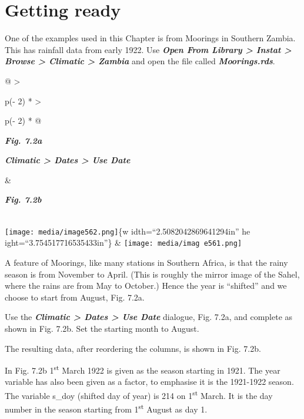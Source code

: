 \documentclass[
  letterpaper,
  DIV=11,
  numbers=noendperiod]{scrreprt}
\begin{document}
\section{Getting ready}\label{getting-ready}

One of the examples used in this Chapter is from Moorings in Southern
Zambia. This has rainfall data from early 1922. Use \textbf{\emph{Open
From Library \textgreater{} Instat \textgreater{} Browse \textgreater{}
Climatic \textgreater{} Zambia}} and open the file called
\textbf{\emph{Moorings.rds}}.

\begin{longtable}[]{@{}
  >{\raggedright\arraybackslash}p{(\columnwidth - 2\tabcolsep) * }
  >{\raggedright\arraybackslash}p{(\columnwidth - 2\tabcolsep) * }@{}}
\toprule\noalign{}
\begin{minipage}[b]{\linewidth}\raggedright
\textbf{\emph{Fig. 7.2a}}

\textbf{\emph{Climatic \textgreater{} Dates \textgreater{} Use Date}}
\end{minipage} & \begin{minipage}[b]{\linewidth}\raggedright
\textbf{\emph{Fig. 7.2b}}
\end{minipage} \\
\midrule\noalign{}
\endhead
\bottomrule\noalign{}
\endlastfoot
\texttt{[image: media/image562.png]}\{w idth=``2.5082042869641294in'' he
ight=``3.754517716535433in''\} &
\texttt{[image: media/imag e561.png]} \\
\end{longtable}

A feature of Moorings, like many stations in Southern Africa, is that
the rainy season is from November to April. (This is roughly the mirror
image of the Sahel, where the rains are from May to October.) Hence the
year is ``shifted'' and we choose to start from August, Fig. 7.2a.

Use the \textbf{\emph{Climatic \textgreater{} Dates \textgreater{} Use
Date}} dialogue, Fig. 7.2a, and complete as shown in Fig. 7.2b. Set the
starting month to August.

The resulting data, after reordering the columns, is shown in Fig. 7.2b.

In Fig. 7.2b 1\textsuperscript{st} March 1922 is given as the season
starting in 1921. The year variable has also been given as a factor, to
emphasise it is the 1921-1922 season. The variable s\_doy (shifted day
of year) is 214 on 1\textsuperscript{st} March. It is the day number in
the season starting from 1\textsuperscript{st} August as day 1.
\end{document}
